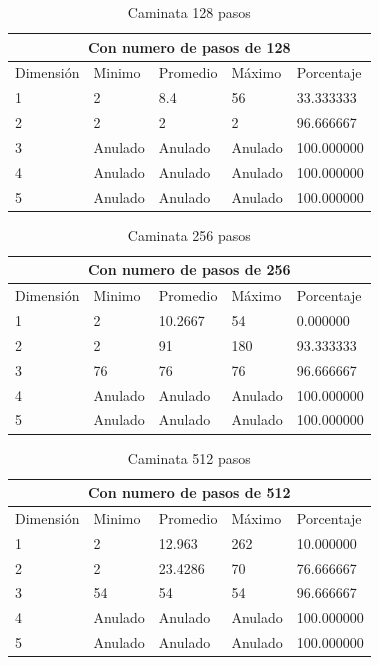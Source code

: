 \documentclass{article}
\begin{document}
\begin{table}[H]
\centering
\begin{tabular}{ |p{2cm}||p{2cm}|p{2cm}|p{2cm}|p{2cm  }|}
 \hline
 \multicolumn{5}{|c|}{Con numero de pasos de 128} \\
 \hline
 Dimensión&Minimo&Promedio&Máximo&Porcentaje\\
 \hline
 1   & 2       & 8.4      & 56      & 33.333333\\
 2   & 2       & 2        & 2       & 96.666667\\
 3   & Anulado & Anulado  & Anulado & 100.000000\\
 4   & Anulado & Anulado  & Anulado & 100.000000\\
 5   & Anulado & Anulado  & Anulado & 100.000000\\
 \hline
\end{tabular}
\caption{Caminata 128 pasos}
\label{table:4}
\end{table}

\begin{table}[H]
\centering
\begin{tabular}{ |p{2cm}||p{2cm}|p{2cm}|p{2cm}|p{2cm  }|}
 \hline
 \multicolumn{5}{|c|}{Con numero de pasos de 256} \\
 \hline
 Dimensión&Minimo&Promedio&Máximo&Porcentaje\\
 \hline
 1   & 2       & 10.2667  & 54      & 0.000000\\
 2   & 2       & 91       & 180     & 93.333333\\
 3   & 76      & 76       & 76      & 96.666667\\
 4   & Anulado & Anulado  & Anulado & 100.000000\\
 5   & Anulado & Anulado  & Anulado & 100.000000\\
 \hline
\end{tabular}
\caption{Caminata 256 pasos}
\label{table:5}
\end{table}

\begin{table}[H]
\centering
\begin{tabular}{ |p{2cm}||p{2cm}|p{2cm}|p{2cm}|p{2cm  }|}
 \hline
 \multicolumn{5}{|c|}{Con numero de pasos de 512} \\
 \hline
 Dimensión&Minimo&Promedio&Máximo&Porcentaje\\
 \hline
 1   & 2       & 12.963   & 262      & 10.000000\\
 2   & 2       & 23.4286  & 70       & 76.666667\\
 3   & 54      & 54       & 54       & 96.666667\\
 4   & Anulado & Anulado  & Anulado  & 100.000000\\
 5   & Anulado & Anulado  & Anulado  & 100.000000\\
 \hline
\end{tabular}
\caption{Caminata 512 pasos}
\label{table:6}
\end{table}
\end{document}
